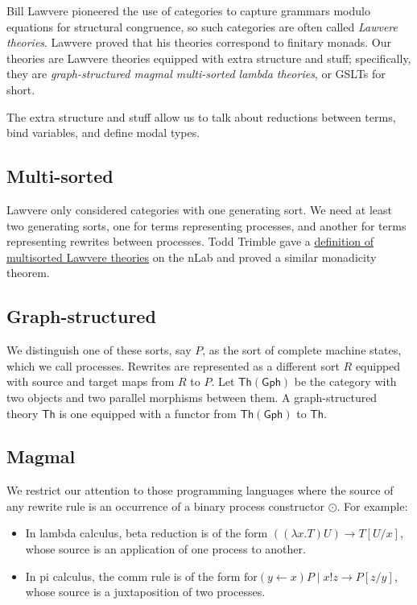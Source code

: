\documentclass{article}
\begin{document}
Bill Lawvere pioneered the use of categories to capture grammars modulo equations for structural congruence, so such categories are often called \emph{Lawvere theories}. Lawvere proved that his theories correspond to finitary monads. Our theories are Lawvere theories equipped with extra structure and stuff; specifically, they are \emph{graph-structured magmal multi-sorted lambda theories}, or GSLTs for short.

The extra structure and stuff allow us to talk about reductions between terms, bind variables, and define modal types.

\subsection{Multi-sorted}

Lawvere only considered categories with one generating sort. We need at least two generating sorts, one for terms representing processes, and another for terms representing rewrites between processes. Todd Trimble gave a \href{https://ncatlab.org/toddtrimble/published/multisorted+Lawvere+theories}{definition of multisorted Lawvere theories} on the nLab and proved a similar monadicity theorem.

\subsection{Graph-structured}

We distinguish one of these sorts, say $P$, as the sort of complete machine states, which we call processes. Rewrites are represented as a different sort $R$ equipped with source and target maps from $R$ to $P$. Let $\mathsf{Th(Gph)}$ be the category with two objects and two parallel morphisms between them. A graph-structured theory $\mathsf{Th}$ is one equipped with a functor from $\mathsf{Th(Gph)}$ to $\mathsf{Th}$.

\subsection{Magmal}

We restrict our attention to those programming languages where the source of any rewrite rule is an occurrence of a binary process constructor $\odot$. For example:

\begin{itemize}
    \item In lambda calculus, beta reduction is of the form $((\lambda x.T) U) \to T[U/x]$, whose source is an application of one process to another.
    \item In pi calculus, the comm rule is of the form $\text{for}(y \leftarrow x)P \mid x!z \to P[z/y]$, whose source is a juxtaposition of two processes.
\end{itemize}
\end{document}
